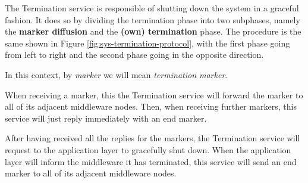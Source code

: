 \label{sec:mw-termination-descr}

The Termination service is responsible of shutting down the system in a
graceful fashion.
It does so by dividing the termination phase into two subphases, namely the
\textbf{marker diffusion} and the \textbf{(own) termination} phase. The
procedure is the same shown in Figure \ref{fig:sys-termination-protocol}, with
the first phase going from left to right and the second phase going in the
opposite direction.

In this context, by \textit{marker} we will mean \textit{termination marker}.

When receiving a marker, this the Termination service will forward the marker
to all of its adjacent middleware nodes.
Then, when receiving further markers, this service will just reply immediately
with an end marker.

After having received all the replies for the markers, the Termination service
will request to the application layer to gracefully shut down.
When the application layer will inform the middleware it has terminated, this
service will send an end marker to all of its adjacent middleware nodes.
